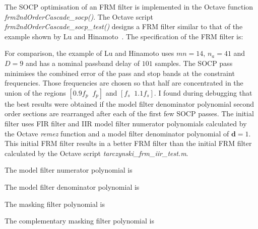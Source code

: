 \documentclass[a4paper,twoside,10pt,english]{report}
\begin{document}
The SOCP optimisation of an FRM filter is implemented in the Octave function
\emph{frm2ndOrderCascade\_socp()}. The Octave script
\emph{frm2ndOrderCascade\_socp\_test()} designs a FRM filter similar to that
of the example shown by Lu and 
Hinamoto~\cite[Section V.E]{LuHinamoto_IIRFrequencyMaskingFiltersConeProgramming}.
The specification of the FRM filter is:
\begin{small}

\end{small}

For comparison, the example of Lu and Hinamoto uses $mn=14$, $n_{a}=41$ and $D=9$
and has a nominal passband delay of $101$ samples. The SOCP pass minimises the
combined error of the pass and stop bands at the constraint frequencies. Those 
frequencies are chosen so that half are concentrated in the union of the regions
$[0.9f_{p} \;\; f_{p}]$ and $[f_{s} \;\; 1.1f_{s}]$. I found during debugging that
the best results were obtained if the model filter denominator polynomial second
order sections are rearranged after each of the first few SOCP passes. The 
initial filter uses FIR filter and IIR model filter numerator polynomials 
calculated by the Octave \emph{remez} function and a model filter denominator 
polynomial of $\boldsymbol{d}=1$. This initial FRM filter results in a better 
FRM filter than the initial FRM filter calculated by the Octave script
\emph{tarczynski\_frm\_iir\_test.m}.

The model filter numerator polynomial is
\begin{small}

\end{small}
The model filter denominator polynomial is
\begin{small}

\end{small}
The masking filter polynomial is
\begin{small}

\end{small}
The complementary masking filter polynomial is
\begin{small}

\end{small}
\end{document}

